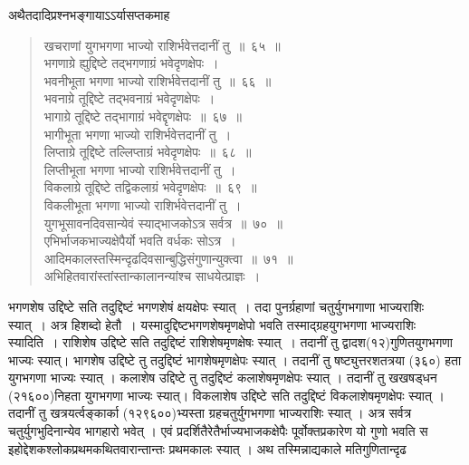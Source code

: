 \documentclass[11pt, openany]{book}
\begin{document}
\newpage
\thispagestyle{fancy}
\fancyhf{}
\indent
अथैतदादिप्रश्नभङ्गायाऽऽर्यासप्तकमाह\textendash\
\begin{quote}
{\ks खचराणां युगभगणा भाज्यो राशिर्भवेत्तदानीं तु~॥~६५~॥\\
भगणाग्रे ह्युद्दिष्टे तद्भगणाग्रं भवेदृणक्षेपः~।\\
भवनीभूता भगणा भाज्यो राशिर्भवेत्तदानीं तु~॥~६६~॥\\
भवनाग्रे तूद्दिष्टे तद्भवनाग्रं भवेदृणक्षेपः~।\\
भागाग्रे तूद्दिष्टे तद्भागाग्रं भवेद्दृणक्षेपः~॥~६७~॥\\
भागीभूता भगणा भाज्यो राशिर्भवेत्तदानीं तु~।\\
लिप्ताग्रे तूद्दिष्टे तल्लिप्ताग्रं भवेदृणक्षेपः~॥~६८~॥\\
लिप्तीभूता भगणा भाज्यो राशिर्भवेत्तदानीं तु~।\\
विकलाग्रे तूद्दिष्टे तद्विकलाग्रं भवेदृणक्षेपः~॥~६९~॥\\
विकलीभूता भगणा भाज्यो राशिर्भवेत्तदानीं तु~।\\
युगभूसावनदिवसान्येवं स्याद्भाजकोऽत्र सर्वत्र~॥~७०~॥\\
एभिर्भाजकभाज्यक्षेपैर्यो भवति वर्धकः सोऽत्र~।\\
आदिमकालस्तस्मिन्दृढदिवसान्बुद्धिसंगुणान्युक्त्वा~॥~७१~॥\\
अभिहितवारांस्तांस्तान्कालानन्यांश्च साधयेत्प्राज्ञः~।}
\end{quote}

\indent
भगणशेष उद्दिष्टे सति तदुद्दिष्टं भगणशेषं क्षयक्षेपः स्यात्~। तदा पुनर्ग्रहाणां चतुर्युगभगाणा भाज्यराशिः स्यात्~। अत्र हिशब्दो हेतौ~। यस्मादुद्दिष्टभगणशेषमृणक्षेपो भवति तस्माद्ग्रहयुगभगणा भाज्यराशिः स्यादिति~। राशिशेष उद्दिष्टे सति तदुद्दिष्टं राशिशेषमृणक्षेषः स्यात्~। तदानीं तु द्वादश(१२)गुणितयुगभगणा भाज्यः स्यात्। भागशेष उद्दिष्टे तु तदुद्दिष्टं भागशेषमृणक्षेपः स्यात् । तदानीं तु षष्ट्युत्तरशतत्रया (३६०) हता युगभगणा भाज्यः स्यात् । कलाशेष उद्दिष्टे तु तदुद्दिष्टं कलाशेषमृणक्षेपः स्यात् । तदानीं तु खखषड्धन (२१६००)निहता युगभगणा भाज्यः स्यात्। विकलाशेष उद्दिष्टे सति तदुद्दिष्टं विकलाशेषमृणक्षेपः स्यात् । तदानीं तु खत्रयर्त्वङ्कार्का (१२९६००)भ्यस्ता ग्रहचतुर्युगभगणा  भाज्यराशिः स्यात् । अत्र सर्वत्र चतुर्युगभुदिनान्येव भागहारो भवेत् । एवं प्रदर्शितैरेतैर्भाज्यभाजकक्षेपैः पूर्वोक्तप्रकारेण यो गुणो भवति स इहोद्देशकश्लोकप्रथमकथितवारान्तान्तः प्रथमकालः स्यात् । अथ तस्मिन्नाद्यकाले मतिगुणितान्दृढ\textendash
\end{document}
